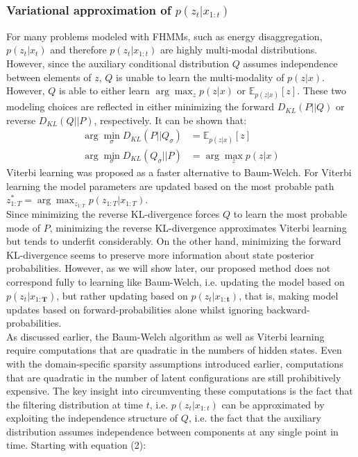 \subsubsection{Variational approximation of $p(z_t|x_{1:t})$}
For many problems modeled with FHMMs, such as energy disaggregation, $p(z_t|x_t)$ and therefore $p(z_t|x_{1:t})$ are highly multi-modal distributions. However, since the auxiliary conditional distribution $Q$ assumes independence between elements of $z$, $Q$ is unable to learn the multi-modality of $p(z|x)$. However, $Q$ is able to either learn $\arg \max_z p(z|x)$ or $\mathbb{E}_{p(z|x)}[z]$. These two modeling choices are reflected in either minimizing the forward $D_{KL}(P||Q)$ or reverse $D_{KL}(Q||P)$, respectively. It can be shown that:
\begin{align*}
 \arg \min_{\sigma} D_{KL}(P||Q_\sigma) &= \mathbb{E}_{p(z|x)}[z] \\
 \arg \min_{\sigma} D_{KL}(Q_\sigma||P) &= \arg \max_z p(z|x)
 \end{align*}
Viterbi learning was proposed as a faster alternative to Baum-Welch. For Viterbi learning the model parameters are updated based on the most probable path $z^*_{1:T} = \arg \max_{z_{1:T}} p(z_{1:T} | x_{1:T})$.\\ Since minimizing the reverse KL-divergence forces $Q$ to learn the most probable mode of $P$, minimizing the reverse KL-divergence approximates Viterbi learning but tends to underfit considerably. On the other hand, minimizing the forward KL-divergence seems to preserve more information about state posterior probabilities. However, as we will show later, our proposed method does not correspond fully to learning like Baum-Welch, i.e. updating the model based on $p(z_t|x_{1:\boldsymbol{T}})$, but rather updating based on $p(z_t|x_{1:\boldsymbol{t}})$, that is, making model updates based on forward-probabilities alone whilst ignoring backward-probabilities.\\
As discussed earlier, the Baum-Welch algorithm as well as Viterbi learning require computations that are quadratic in the numbers of hidden states. Even with the domain-specific sparsity assumptions introduced earlier, computations that are quadratic in the number of latent configurations are still prohibitively expensive. The key insight into circumventing these computations is the fact that the filtering distribution at time $t$, i.e. $p(z_t|x_{1:t})$ can be approximated by exploiting the independence structure of $Q$, i.e. the fact that the auxiliary distribution assumes independence between components at any single point in time. Starting with equation (2):
